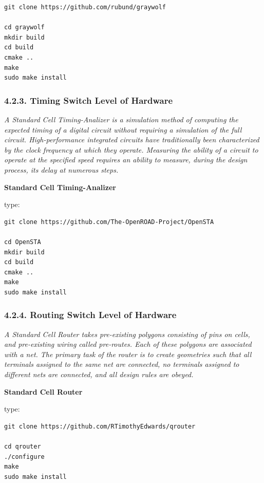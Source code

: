 \documentclass[
]{article}
\begin{document}
\begin{verbatim}
git clone https://github.com/rubund/graywolf

cd graywolf
mkdir build
cd build
cmake ..
make
sudo make install
\end{verbatim}

\hypertarget{timing-switch-level-of-hardware-1}{%
\subsubsection{4.2.3. Timing Switch Level of
Hardware}\label{timing-switch-level-of-hardware-1}}

\emph{A Standard Cell Timing-Analizer is a simulation method of
computing the expected timing of a digital circuit without requiring a
simulation of the full circuit. High-performance integrated circuits
have traditionally been characterized by the clock frequency at which
they operate. Measuring the ability of a circuit to operate at the
specified speed requires an ability to measure, during the design
process, its delay at numerous steps.}

\textbf{Standard Cell Timing-Analizer}

type:

\begin{verbatim}
git clone https://github.com/The-OpenROAD-Project/OpenSTA

cd OpenSTA
mkdir build
cd build
cmake ..
make
sudo make install
\end{verbatim}

\hypertarget{routing-switch-level-of-hardware-1}{%
\subsubsection{4.2.4. Routing Switch Level of
Hardware}\label{routing-switch-level-of-hardware-1}}

\emph{A Standard Cell Router takes pre-existing polygons consisting of
pins on cells, and pre-existing wiring called pre-routes. Each of these
polygons are associated with a net. The primary task of the router is to
create geometries such that all terminals assigned to the same net are
connected, no terminals assigned to different nets are connected, and
all design rules are obeyed.}

\textbf{Standard Cell Router}

type:

\begin{verbatim}
git clone https://github.com/RTimothyEdwards/qrouter

cd qrouter
./configure
make
sudo make install
\end{verbatim}
\end{document}
